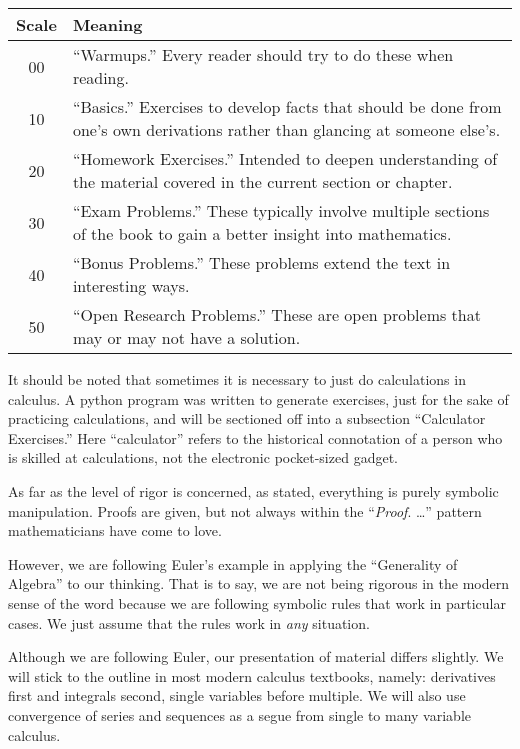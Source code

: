 \medskip
\begin{tabular}{c | p{10cm}}
\toprule
Scale & Meaning \\
\midrule 
00 & ``Warmups.'' Every reader should try to do these when reading.\\
10 & ``Basics.'' Exercises to develop facts that should be done
from one's own derivations rather than glancing at someone else's.\\
20 & ``Homework Exercises.'' Intended to deepen understanding of
the material covered in the current section or chapter. \\
30 & ``Exam Problems.'' These typically involve multiple sections
of the book to gain a better insight into mathematics. \\
40 & ``Bonus Problems.'' These problems extend the text in
interesting ways. \\
50 & ``Open Research Problems.'' These are open problems that may
or may not have a solution. \\
\bottomrule
\end{tabular}

\medskip
\noindent{}It should be noted that sometimes it is necessary to just do
calculations in calculus. A python program was written to
generate exercises, just for the sake of practicing calculations,
and will be sectioned off into a subsection ``Calculator Exercises.''
Here ``calculator'' refers to the historical connotation of a
person who is skilled at calculations, not the electronic
pocket-sized gadget.

\medskip
As far as the level of rigor is concerned, as stated, everything
is purely symbolic manipulation. Proofs are given, but not always
within the ``\emph{Proof}. \dots \slug'' pattern mathematicians
have come to love.

However, we are following Euler's example in applying the
``Generality of Algebra'' to our thinking. That is to say, we are
not being rigorous in the modern sense of the word because we are
following symbolic rules that work in particular cases. We just
assume that the rules work in \emph{any} situation.

Although we are following Euler, our presentation of material
differs slightly. We will stick to the outline in most modern
calculus textbooks, namely: derivatives first and integrals
second, single variables before multiple. We will also use
convergence of series and sequences as a segue from single to
many variable calculus.

